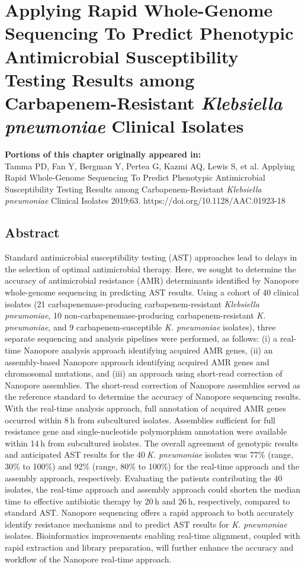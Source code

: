 \chapter{Applying Rapid Whole-Genome Sequencing To Predict Phenotypic Antimicrobial Susceptibility Testing Results among Carbapenem-Resistant \textit{Klebsiella pneumoniae} Clinical Isolates}
\label{chap:amr}

\textbf{Portions of this chapter originally appeared in:} \\
Tamma PD, Fan Y, Bergman Y, Pertea G, Kazmi AQ, Lewis S, et al. Applying Rapid Whole-Genome Sequencing To Predict Phenotypic Antimicrobial Susceptibility Testing Results among Carbapenem-Resistant \textit{Klebsiella pneumoniae} Clinical Isolates 2019;63. https://doi.org/10.1128/AAC.01923-18

\section{Abstract}
\label{sec:abstract}

Standard antimicrobial susceptibility testing (AST) approaches lead to delays in the selection of optimal antimicrobial therapy. Here, we sought to determine the accuracy of antimicrobial resistance (AMR) determinants identified by Nanopore whole-genome sequencing in predicting AST results. Using a cohort of 40 clinical isolates (21 carbapenemase-producing carbapenem-resistant \textit{Klebsiella pneumoniae}, 10 non-carbapenemase-producing carbapenem-resistant \textit{K. pneumoniae}, and 9 carbapenem-susceptible \textit{K. pneumoniae} isolates), three separate sequencing and analysis pipelines were performed, as follows: (i) a real-time Nanopore analysis approach identifying acquired AMR genes, (ii) an assembly-based Nanopore approach identifying acquired AMR genes and chromosomal mutations, and (iii) an approach using short-read correction of Nanopore assemblies. The short-read correction of Nanopore assemblies served as the reference standard to determine the accuracy of Nanopore sequencing results. With the real-time analysis approach, full annotation of acquired AMR genes occurred within 8 h from subcultured isolates. Assemblies sufficient for full resistance gene and single-nucleotide polymorphism annotation were available within 14 h from subcultured isolates. The overall agreement of genotypic results and anticipated AST results for the 40 \textit{K. pneumoniae} isolates was 77\% (range, 30\% to 100\%) and 92\% (range, 80\% to 100\%) for the real-time approach and the assembly approach, respectively. Evaluating the patients contributing the 40 isolates, the real-time approach and assembly approach could shorten the median time to effective antibiotic therapy by 20 h and 26 h, respectively, compared to standard AST. Nanopore sequencing offers a rapid approach to both accurately identify resistance mechanisms and to predict AST results for \textit{K. pneumoniae} isolates. Bioinformatics improvements enabling real-time alignment, coupled with rapid extraction and library preparation, will further enhance the accuracy and workflow of the Nanopore real-time approach.

